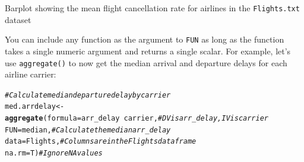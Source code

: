 \documentclass{tufte-book}\usepackage[]{graphicx}\usepackage[]{color}
\makeatletter
\def\maxwidth{ %
  \ifdim\Gin@nat@width>\linewidth
    \linewidth
  \else
    \Gin@nat@width
  \fi
}
\newcommand{\hlcom}[1]{\textcolor[rgb]{0.678,0.584,0.686}{\textit{#1}}}%
\newcommand{\hlopt}[1]{\textcolor[rgb]{0,0,0}{#1}}%
\newcommand{\hlstd}[1]{\textcolor[rgb]{0.345,0.345,0.345}{#1}}%
\newcommand{\hlkwb}[1]{\textcolor[rgb]{0.69,0.353,0.396}{#1}}%
\newcommand{\hlkwc}[1]{\textcolor[rgb]{0.333,0.667,0.333}{#1}}%
\newcommand{\hlkwd}[1]{\textcolor[rgb]{0.737,0.353,0.396}{\textbf{#1}}}%
\newenvironment{kframe}{%
 \def\at@end@of@kframe{}%
 \ifinner\ifhmode%
  \def\at@end@of@kframe{\end{minipage}}%
  \begin{minipage}{\columnwidth}%
 \fi\fi%
 \def\FrameCommand##1{\hskip\@totalleftmargin \hskip-\fboxsep
 \colorbox{shadecolor}{##1}\hskip-\fboxsep
     \hskip-\linewidth \hskip-\@totalleftmargin \hskip\columnwidth}%
 \MakeFramed {\advance\hsize-\width
   \@totalleftmargin\z@ \linewidth\hsize
   \@setminipage}}%
 {\par\unskip\endMakeFramed%
 \at@end@of@kframe}
\newenvironment{knitrout}{}{} %
\makeatother
\begin{document}
\begin{footnotesize}
\begin{marginfigure}
\caption{Barplot showing the mean flight cancellation rate for airlines in the \texttt{Flights.txt} dataset}
\label{fig:barplot}
\end{marginfigure}

You can include any function as the argument to \texttt{FUN} as long as the function takes a single numeric argument and returns a single scalar. For example, let's use \texttt{aggregate()} to now get the median arrival and departure delays for each airline carrier:

\begin{footnotesize}
\begin{knitrout}
\color{fgcolor}\begin{kframe}
\begin{alltt}
\hlcom{# Calculate median departure delay by carrier}
 \hlstd{med.arrdelay} \hlkwb{<-} \hlkwd{aggregate}\hlstd{(}\hlkwc{formula} \hlstd{= arr_delay} \hlopt{~} \hlstd{carrier,} \hlcom{# DV is arr_delay, IV is carrier}
            \hlkwc{FUN} \hlstd{= median,} \hlcom{# Calculate the median arr_delay}
            \hlkwc{data} \hlstd{= Flights,} \hlcom{# Columns are in the Flights dataframe}
            \hlkwc{na.rm} \hlstd{= T)} \hlcom{# Ignore NA values}



\end{alltt}
\end{kframe}
\end{knitrout}
\end{footnotesize}
\end{footnotesize}
\end{document}
